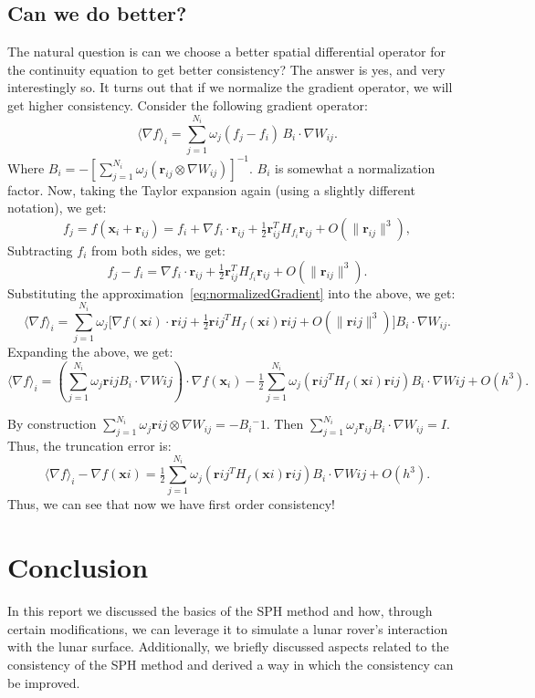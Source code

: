 \documentclass{article}
\newcommand{\rij}{\mathbf{r}_{ij}}
\begin{document}
\subsection*{Can we do better?}
The natural question is can we choose a better spatial differential operator for the continuity equation to get better consistency? The answer is yes, and very interestingly so. It turns out that if we normalize the gradient operator, we will get higher consistency. Consider the following gradient operator:
\begin{equation}
    \label{eq:normalizedGradient}
    \langle \nabla f \rangle_i = \sum_{j=1}^{N_i} \omega_j (f_j - f_i)\,B_i \cdot \nabla W_{ij}.
\end{equation}
Where \(B_i = -\left[ \sum_{j=1}^{N_i} \omega_j (\rij \otimes \nabla W_{ij})\right]^{-1}\). $B_i$ is somewhat a normalization factor. Now, taking the Taylor expansion again (using a slightly different notation), we get:
\[
f_j = f(\mathbf{x}_i + \mathbf{r}_{ij}) = f_i + \nabla f_i \cdot \mathbf{r}_{ij} + \tfrac{1}{2}\mathbf{r}_{ij}^T H_{f_i} \mathbf{r}_{ij} + O(\|\mathbf{r}_{ij}\|^3),
\]
Subtracting $f_i$ from both sides, we get:
\[
f_j - f_i = \nabla f_i \cdot \mathbf{r}_{ij} + \tfrac{1}{2}\mathbf{r}_{ij}^T H_{f_i} \mathbf{r}_{ij} + O(\|\mathbf{r}_{ij}\|^3).
\]
Substituting the approximation~\ref{eq:normalizedGradient} into the above, we get:
\[
\langle \nabla f \rangle_i = \sum_{j=1}^{N_i} \omega_j \bigl[ \nabla f(\mathbf{x}i)\cdot \mathbf{r}{ij} + \tfrac{1}{2}\mathbf{r}{ij}^T H_f(\mathbf{x}i) \mathbf{r}{ij} + O(\|\mathbf{r}{ij}\|^3) \bigr] B_i \cdot \nabla W_{ij}.
\]
Expanding the above, we get:
\[
\langle \nabla f \rangle_i = \left(\sum_{j=1}^{N_i} \omega_j \mathbf{r}{ij} B_i \cdot \nabla W{ij}\right) \cdot \nabla f(\mathbf{x}_i)
-	\tfrac{1}{2}\sum_{j=1}^{N_i}\omega_j (\mathbf{r}{ij}^T H_f(\mathbf{x}i)\mathbf{r}{ij}) B_i \cdot \nabla W{ij} + O(h^3).
\]

By construction $\sum_{j=1}^{N_i} \omega_j \mathbf{r}{ij} \otimes \nabla W_{ij} = -B_i{^-1}$. Then $\sum_{j=1}^{N_i} \omega_j \mathbf{r}_{ij} B_i \cdot \nabla W_{ij} = I$. Thus, the truncation error is:
\[
\langle \nabla f \rangle_i - \nabla f(\mathbf{x}i) = \tfrac{1}{2}\sum_{j=1}^{N_i} \omega_j (\mathbf{r}{ij}^T H_f(\mathbf{x}i)\mathbf{r}{ij}) B_i \cdot \nabla W{ij} + O(h^3).
\]
Thus, we can see that now we have first order consistency!

\section{Conclusion}
In this report we discussed the basics of the SPH method and how, through certain modifications, we can leverage it to simulate a lunar rover's interaction with the lunar surface. Additionally, we briefly discussed aspects related to the consistency of the SPH method and derived a way in which the consistency can be improved.

\end{document}
